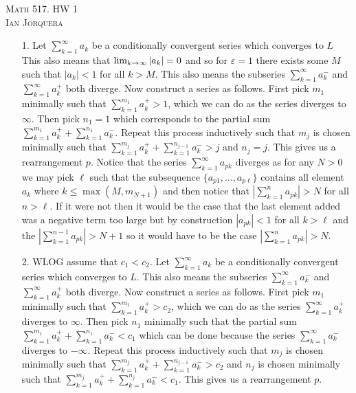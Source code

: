 \documentclass[12pt]{amsart}
\begin{document}
\begin{center}
    \textsc{Math 517. HW 1\\ Ian Jorquera}
\end{center}
\vspace{1em}

\begin{itemize}
    \item[1.] Let $\sum_{k=1}^{\infty}{a_k}$ be a conditionally convergent series which
        converges to $L$ This also means that $\lim_{k\rightarrow\infty}|a_k|=0$ and so for
        $\varepsilon=1$ there exists some $M$ such that $|a_k|<1$ for all $k>M$. This
        also means the subseries $\sum_{k=1}^{\infty}{a^-_k}$ and
        $\sum_{k=1}^{\infty}{a^+_k}$ both diverge. Now construct a series as follows.
        First pick $m_1$ minimally such that $\sum_{k=1}^{m_1}{a^+_k}> 1$, which we can
        do as the series diverges to $\infty$. Then pick $n_1=1$ which corresponds to
        the partial sum $\sum_{k=1}^{m_1}{a^+_k}+\sum_{k=1}^{n_1}{a^-_k}$. Repeat this
        process inductively such that $m_j$ is chosen minimally such that
        $\sum_{k=1}^{m_j}{a^+_k}+\sum_{k=1}^{n_{j-1}}{a^-_k}> j$ and $n_j=j$. This
        gives us a rearrangement $p$. Notice that the series
        $\sum_{k=1}^{\infty}{a_{pk}}$ diverges as for any $N>0$ we may pick $\ell$ such
        that the subsequence $\{a_{p1},\dots,a_{p\ell}\}$ contains all element $a_k$
        where $k\leq\max{(M, m_{N+1})}$ and then notice that
        $|\sum_{k=1}^{n}{a_{pk}}|>N$ for all $n>\ell$. If it were not then it would be
        the case that the last element added was a negative term too large but by
        construction $|a_{pk}|<1$ for all $k>\ell$ and the
        $|\sum_{k=1}^{n-1}{a_{pk}}|>N+1$ so it would have to be the case
        $|\sum_{k=1}^{n}{a_{pk}}|>N$.

    \item[2.] %
        WLOG assume that $c_1<c_2$. Let $\sum_{k=1}^{\infty}{a_k}$ be a conditionally
        convergent series which converges to $L$. This also means the subseries
        $\sum_{k=1}^{\infty}{a^-_k}$ and $\sum_{k=1}^{\infty}{a^+_k}$ both diverge. Now
        construct a series as follows. First pick $m_1$ minimally such that
        $\sum_{k=1}^{m_1}{a^+_k}> c_2$, which we can do as the series
        $\sum_{k=1}^{\infty}{a^+_k}$ diverges to $\infty$. Then pick $n_1$ minimally
        such that the partial sum $\sum_{k=1}^{m_1}{a^+_k}+\sum_{k=1}^{n_1}{a^-_k}<c_1$
        which can be done because the series $\sum_{k=1}^{\infty}{a^-_k}$ diverges to
        $-\infty$. Repeat this process inductively such that $m_j$ is chosen minimally
        such that $\sum_{k=1}^{m_j}{a^+_k}+\sum_{k=1}^{n_{j-1}}{a^-_k}> c_2$ and $n_j$
        is chosen minimally such that
        $\sum_{k=1}^{m_j}{a^+_k}+\sum_{k=1}^{n_{j}}{a^-_k}< c_1$. This gives us a
        rearrangement $p$.


\end{itemize}
\end{document}

